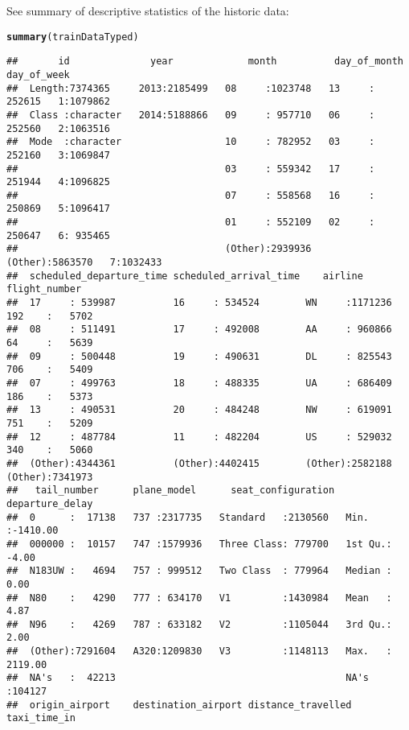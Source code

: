 \documentclass{article}\usepackage[]{graphicx}\usepackage[]{color}
\makeatletter
\newcommand{\hlstd}[1]{\textcolor[rgb]{0.345,0.345,0.345}{#1}}%
\newcommand{\hlkwd}[1]{\textcolor[rgb]{0.737,0.353,0.396}{\textbf{#1}}}%
\newenvironment{kframe}{%
 \def\at@end@of@kframe{}%
 \ifinner\ifhmode%
  \def\at@end@of@kframe{\end{minipage}}%
  \begin{minipage}{\columnwidth}%
 \fi\fi%
 \def\FrameCommand##1{\hskip\@totalleftmargin \hskip-\fboxsep
 \colorbox{shadecolor}{##1}\hskip-\fboxsep
     \hskip-\linewidth \hskip-\@totalleftmargin \hskip\columnwidth}%
 \MakeFramed {\advance\hsize-\width
   \@totalleftmargin\z@ \linewidth\hsize
   \@setminipage}}%
 {\par\unskip\endMakeFramed%
 \at@end@of@kframe}
\newenvironment{knitrout}{}{} %
\makeatother
\begin{document}
\pagebreak

See summary of descriptive statistics of the historic data: 
\begin{knitrout}
\color{fgcolor}\begin{kframe}
\begin{alltt}
\hlkwd{summary}\hlstd{(trainDataTyped)}
\end{alltt}
\begin{verbatim}
##       id              year             month          day_of_month     day_of_week
##  Length:7374365     2013:2185499   08     :1023748   13     : 252615   1:1079862  
##  Class :character   2014:5188866   09     : 957710   06     : 252560   2:1063516  
##  Mode  :character                  10     : 782952   03     : 252160   3:1069847  
##                                    03     : 559342   17     : 251944   4:1096825  
##                                    07     : 558568   16     : 250869   5:1096417  
##                                    01     : 552109   02     : 250647   6: 935465  
##                                    (Other):2939936   (Other):5863570   7:1032433  
##  scheduled_departure_time scheduled_arrival_time    airline        flight_number    
##  17     : 539987          16     : 534524        WN     :1171236   192    :   5702  
##  08     : 511491          17     : 492008        AA     : 960866   64     :   5639  
##  09     : 500448          19     : 490631        DL     : 825543   706    :   5409  
##  07     : 499763          18     : 488335        UA     : 686409   186    :   5373  
##  13     : 490531          20     : 484248        NW     : 619091   751    :   5209  
##  12     : 487784          11     : 482204        US     : 529032   340    :   5060  
##  (Other):4344361          (Other):4402415        (Other):2582188   (Other):7341973  
##   tail_number      plane_model      seat_configuration  departure_delay   
##  0      :  17138   737 :2317735   Standard   :2130560   Min.   :-1410.00  
##  000000 :  10157   747 :1579936   Three Class: 779700   1st Qu.:   -4.00  
##  N183UW :   4694   757 : 999512   Two Class  : 779964   Median :    0.00  
##  N80    :   4290   777 : 634170   V1         :1430984   Mean   :    4.87  
##  N96    :   4269   787 : 633182   V2         :1105044   3rd Qu.:    2.00  
##  (Other):7291604   A320:1209830   V3         :1148113   Max.   : 2119.00  
##  NA's   :  42213                                        NA's   :104127    
##  origin_airport    destination_airport distance_travelled  taxi_time_in     

\end{verbatim}
\end{kframe}
\end{knitrout}
\end{document}
